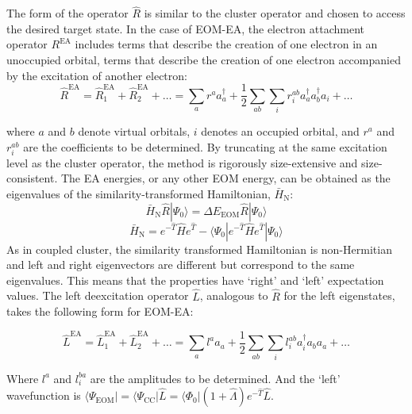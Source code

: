 The form of the operator $\hat{R}$ is similar to the cluster operator and chosen to access the desired target state. In the case of EOM-EA, the electron attachment operator $R^{\text{EA}}$ includes terms that describe the creation of one electron in an unoccupied orbital, terms that describe the creation of one electron accompanied by the excitation of another electron:
\begin{equation}\label{eq:R_EA}
    \hat{R}^{\mathrm{EA}} = \hat{R}_1^{\mathrm{EA}} + \hat{R}_2^{\mathrm{EA}} + \ldots = \sum_{a} r^a a_a^{\dagger} + \frac{1}{2}\sum_{ab} \sum_{i} r^{ab}_{i} a_a^{\dagger} a_b^{\dagger} a_i + \ldots
\end{equation}

where $a$ and $b$ denote virtual orbitals, $i$ denotes an occupied orbital, and $r^a$ and $r^{ab}_{i}$ are the coefficients to be determined. By truncating at the same excitation level as the cluster operator, the method is rigorously size-extensive and size-consistent. The EA energies, or any other EOM energy, can be obtained as the eigenvalues of the similarity-transformed Hamiltonian, $\bar{H}_{\mathrm{N}}$:
\begin{equation}
    \bar{H}_{\mathrm{N}} \hat{R} | \Psi_0 \rangle = \Delta E_{\mathrm{EOM}} \hat{R} | \Psi_0 \rangle
\end{equation}
\begin{equation}
    \bar{H}_{\mathrm{N}} = e^{-\hat{T}} \hat{H} e^{\hat{T}} - \langle \Psi_0 | e^{-\hat{T}} \hat{H} e^{\hat{T}} | \Psi_0 \rangle
\end{equation}
As in coupled cluster, the similarity transformed Hamiltonian is non-Hermitian and left and right eigenvectors are different but correspond to the same eigenvalues. This means that the properties have `right' and `left' expectation values. The left deexcitation operator $\hat{L}$, analogous to $\hat{R}$ for the left eigenstates, takes the following form for EOM-EA:

\begin{equation}
\hat{L}^{\mathrm{EA}} = \hat{L}_1^{\mathrm{EA}} + \hat{L}_2^{\mathrm{EA}} + \ldots = \sum_{a} l^a a_a + \frac{1}{2}\sum_{ab} \sum_{i} l^{ab}_{i} a_i^{\dagger} a_b a_a + \ldots
\end{equation}

Where $l^a$ and $l^{ba}_{i}$ are the amplitudes to be determined. And the `left' wavefunction is $\langle\Psi_{\mathrm{EOM}}| = \langle\Psi_{\mathrm{CC}}| \hat{L} = \langle\Phi_0|(1 + \hat{\Lambda})e^{-\hat{T}}\hat{L}$.

